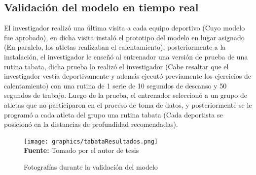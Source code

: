 \subsection{Validaci\'on  del modelo en tiempo real}
El investigador realiz\'o una \'ultima visita a cada equipo deportivo (Cuyo modelo fue aprobado), en dicha visita instal\'o el prototipo del modelo en lugar asignado (En paralelo, los atletas realizaban el calentamiento), posteriormente a la instalaci\'on, el investigador le ense\~n\'o al entrenador una versi\'on de prueba de una rutina tabata, dicha prueba lo realiz\'o el investigador (Cabe resaltar que el investigador vest\'ia deportivamente y adem\'as ejecut\'o previamente los ejercicios de calentamiento) con una rutina de 1 serie de 10 segundos de descanso y 50 segundos de trabajo. Luego de la prueba, el entrenador seleccion\'o a un grupo de atletas que no participaron en el proceso de toma de datos, y posteriormente se le program\'o a cada atleta del grupo una rutina tabata (Cada deportista se posicion\'o en la distancias de profundidad recomendadas).
 \begin{figure}[H]
	\caption{Fotograf\'ias durante la validaci\'on del modelo}
	\label{fig:getvalidationStep}
	\centering
	\texttt{[image: graphics/tabataResultados.png]} \\
	\textbf{Fuente:} Tomado por el autor de tesis
\end{figure} 